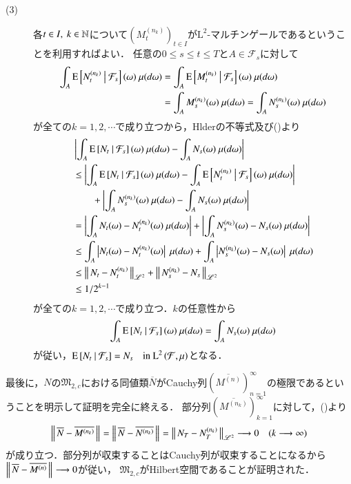 \begin{prf}
\begin{description}
			\item[(3)]
				各$t \in I,\ k \in \mathbb{N}$について$(M^{(n_k)}_t)_{t \in I}$が$\mathrm{L}^2$-マルチンゲールであるということを利用すればよい．
				任意の$0 \leq s \leq t \leq T$と$A \in \mathcal{F}_s$に対して
				\begin{align}
					\int_{A} \cexp{N^{(n_k)}_t}{\mathcal{F}_s}(\omega)\ \mu(d\omega) &= \int_{A} \cexp{M^{(n_k)}_t}{\mathcal{F}_s}(\omega)\ \mu(d\omega) \\
					&= \int_{A} M^{(n_k)}_s(\omega)\ \mu(d\omega) = \int_{A} N^{(n_k)}_s(\omega)\ \mu(d\omega)
				\end{align}
				が全ての$k = 1,2,\cdots$で成り立つから，Hlderの不等式及び()より
				\begin{align}
					&\left| \int_{A} \cexp{N_t}{\mathcal{F}_s}(\omega)\ \mu(d\omega) - \int_{A} N_s(\omega)\ \mu(d\omega) \right| \\
					&\leq \left| \int_{A} \cexp{N_t}{\mathcal{F}_s}(\omega)\ \mu(d\omega) - \int_{A} \cexp{N^{(n_k)}_t}{\mathcal{F}_s}(\omega)\ \mu(d\omega) \right| \\
						&\qquad+ \left| \int_{A} N^{(n_k)}_s(\omega)\ \mu(d\omega) - \int_{A} N_s(\omega)\ \mu(d\omega) \right| \\
					&= \left| \int_{A} N_t(\omega) - N^{(n_k)}_t(\omega)\ \mu(d\omega) \right|
						+ \left| \int_{A} N^{(n_k)}_s(\omega) - N_s(\omega)\ \mu(d\omega) \right| \\
					&\leq \int_{A} \left| N_t(\omega) - N^{(n_k)}_t(\omega) \right|\ \mu(d\omega)
						+ \int_{A} \left| N^{(n_k)}_s(\omega) - N_s(\omega) \right|\ \mu(d\omega) \\
					&\leq \Norm{N_t - N^{(n_k)}_t}{\mathscr{L}^2} + \Norm{N^{(n_k)}_s - N_s}{\mathscr{L}^2} \\
					&\leq 1/2^{k-1}
				\end{align}
				が全ての$k = 1,2,\cdots$で成り立つ．$k$の任意性から
				\begin{align}
					\int_{A} \cexp{N_t}{\mathcal{F}_s}(\omega)\ \mu(d\omega)
					= \int_{A} N_s(\omega)\ \mu(d\omega)
				\end{align}
				が従い，$\operatorname{E} \left[ N_t \ \middle|\ \mathcal{F}_s \right] = N_s \quad \mbox{in $\operatorname{L}^{2} \left(\mathcal{F},\mu\right)$}$となる．
		\end{description}
	
		最後に，$N$の$\mathfrak{M}_{2,c}$における同値類$\overline{N}$がCauchy列$\left(\overline{M^{(n)}}\right)_{n=1}^{\infty}$の極限であるということを明示して証明を完全に終える．
		部分列$\left(\overline{M^{(n_k)}}\right)_{k=1}^{\infty}$に対して，()より
		\begin{align}
				\left\|\, \overline{N} - \overline{M^{(n_k)}}\, \right\|_{} 
				= \left\|\, \overline{N} - \overline{N^{(n_k)}}\, \right\|_{}
				= \left\|\, N_T - N^{(n_k)}_T\, \right\|_{\mathscr{L}^2} \longrightarrow 0 \quad (k \longrightarrow \infty)
		\end{align}
		が成り立つ．部分列が収束することはCauchy列が収束することになるから$\left\|\, \overline{N} - \overline{M^{(n)}}\, \right\|_{} \longrightarrow 0$が従い，
		$\mathfrak{M}_{2,c}$がHilbert空間であることが証明された．
		\QED
	\end{prf}
